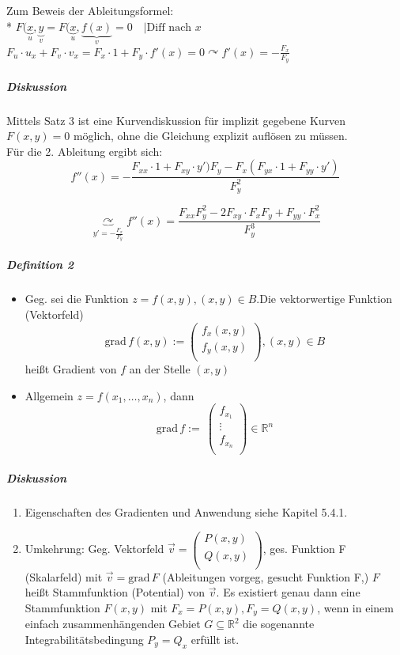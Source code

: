 \documentclass[a4paper]{scrartcl}
\begin{document}
Zum Beweis der Ableitungsformel:\\*
$F(\underbrace{x}_{u}, \underbrace{y}_{v} = F(\underbrace{x}_{u},\underbrace{f(x)}_{v} = 0 \quad | \text{Diff nach } x$\\
$F_u \cdot u_x + F_v \cdot v_x = F_x \cdot 1 + F_y \cdot f'(x) = 0 \curvearrowright f'(x) = - \frac{F_x}{F_y}$

\subparagraph{Diskussion} Mittels Satz 3 ist eine Kurvendiskussion für implizit gegebene Kurven $F(x,y) = 0$ möglich, ohne die Gleichung explizit auflösen zu müssen.\\
Für die 2. Ableitung ergibt sich:
\[f'' (x) = - \frac{F_{xx} \cdot 1 + F_{xy} \cdot y') F_y - F_x ( F_{yx} \cdot 1 + F_{yy} \cdot y')}{F_y^2}\]

\[\underbrace{\curvearrowright}_{y'=-\frac{F_x}{F_y}} f''(x) = \frac{F_{xx} F_y^2 - 2 F_{xy} \cdot F_x F_y + F_{yy} \cdot F_x^2}{F_y^3}\]

\subparagraph{Definition 2}
\begin{itemize}
\item Geg. sei die Funktion $z=f(x,y), (x,y) \in B$.Die vektorwertige Funktion (Vektorfeld)
\[ \text{grad}\, f(x,y) := \begin{pmatrix} f_x(x,y)\\ f_y(x,y)\\ \end{pmatrix}, (x,y) \in B\]
heißt Gradient von $f$ an der Stelle $(x,y)$
\item Allgemein $z=f(x_1,\dots,x_n)$, dann 
\[ \text{grad} \, f:=\ \begin{pmatrix} f_{x_1} \\ \vdots \\ f_{x_n}\\ \end{pmatrix} \in \mathbb{R}^n\]
\end{itemize}

\subparagraph{Diskussion}
\begin{enumerate}
\item Eigenschaften des Gradienten und Anwendung siehe Kapitel 5.4.1.
\item Umkehrung: Geg. Vektorfeld $\vec{v} = \begin{pmatrix} P(x,y) \\ Q(x,y) \\ \end{pmatrix}$, ges. Funktion F (Skalarfeld) mit $\vec{v} = \text{grad}\, F$ (Ableitungen vorgeg, gesucht Funktion F,) $F$ heißt Stammfunktion (Potential) von $\vec{v}$. Es existiert genau dann eine Stammfunktion $F(x,y)$ mit $F_x = P(x,y), F_y=Q(x,y)$, wenn in einem einfach zusammenhängenden Gebiet $G \subseteq \mathbb{R}^2 $ die sogenannte Integrabilitätsbedingung $P_y = Q_x$ erfüllt ist.
\end{enumerate}
\end{document}
